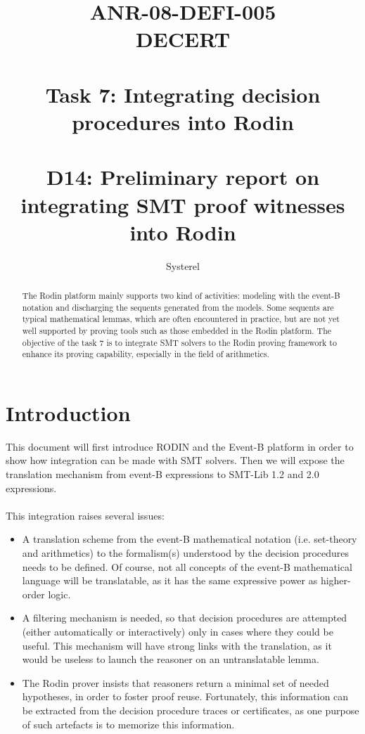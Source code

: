 \documentclass[10pt,a4paper]{report}
\title{ANR-08-DEFI-005 \\ DECERT \\ ~ \\ Task 7: Integrating decision procedures into Rodin \\ ~ \\ D14: Preliminary report on integrating SMT proof witnesses into Rodin}
\author{Systerel}
\begin{document}
\maketitle

\begin{abstract}

The Rodin platform \cite{RODIN} mainly supports two kind of activities: modeling with the event-B notation and discharging the sequents generated from the models. 
Some sequents are typical mathematical lemmas, which are often encountered in practice, but are not yet well supported by proving tools such as those embedded in the Rodin platform.
The objective of the task 7 is to integrate SMT solvers to the Rodin proving framework to enhance its proving capability, especially in the field of arithmetics.

\end{abstract}

\tableofcontents

\section{Introduction}
This document will first introduce RODIN and the Event-B platform in order to show how integration can be made with SMT solvers. Then we will expose the translation mechanism from event-B expressions to SMT-Lib 1.2 and 2.0 expressions.  

\paragraph{}
This integration raises several issues:
\begin{itemize}
\item A translation scheme from the event-B mathematical notation (i.e. set-theory and arithmetics) to the formalism(s) understood by the decision procedures needs to be defined. Of course, not all
concepts of the event-B mathematical language will be translatable, as it has the same expressive
power as higher-order logic.
\item A filtering mechanism is needed, so that decision procedures are attempted (either automatically or interactively) only in cases where they could be useful. This mechanism will have strong links with the translation, as it would be useless to launch the reasoner on an untranslatable lemma.
\item The Rodin prover insists that reasoners return a minimal set of needed hypotheses, in order to foster proof reuse. Fortunately, this information can be extracted from the decision procedure
traces or certificates, as one purpose of such artefacts is to memorize this information.
\end{itemize}
\end{document}
